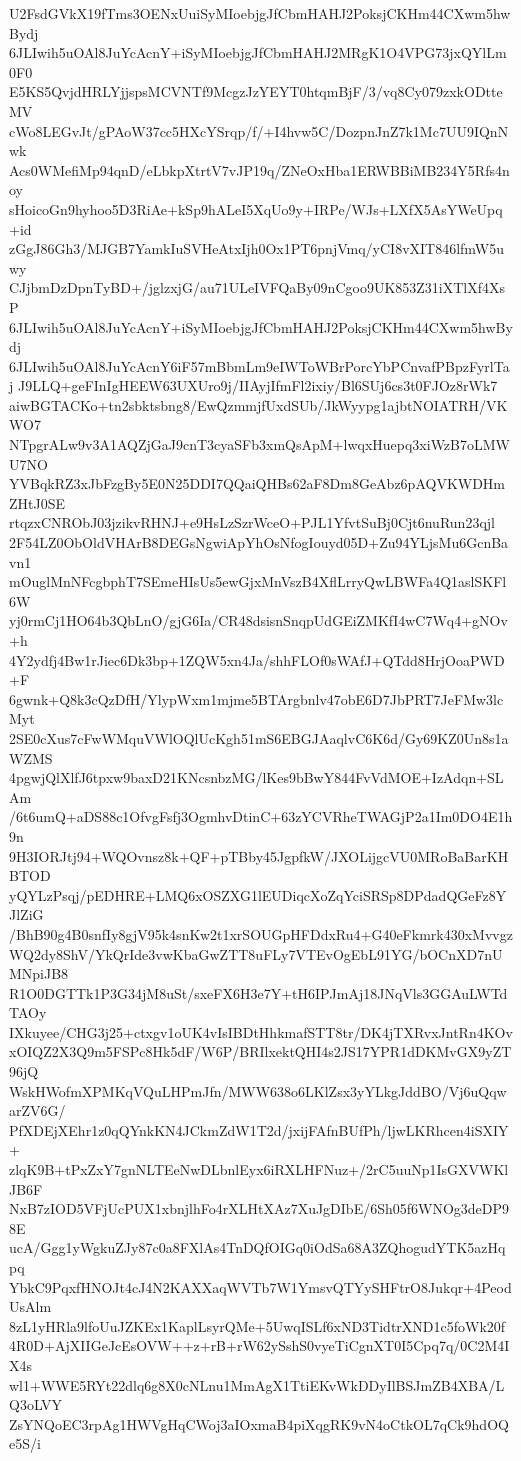 U2FsdGVkX19fTms3OENxUuiSyMIoebjgJfCbmHAHJ2PoksjCKHm44CXwm5hwBydj
6JLIwih5uOAl8JuYcAcnY+iSyMIoebjgJfCbmHAHJ2MRgK1O4VPG73jxQYlLm0F0
E5KS5QvjdHRLYjjspsMCVNTf9McgzJzYEYT0htqmBjF/3/vq8Cy079zxkODtteMV
cWo8LEGvJt/gPAoW37cc5HXcYSrqp/f/+I4hvw5C/DozpnJnZ7k1Mc7UU9IQnNwk
Acs0WMefiMp94qnD/eLbkpXtrtV7vJP19q/ZNeOxHba1ERWBBiMB234Y5Rfs4noy
sHoicoGn9hyhoo5D3RiAe+kSp9hALeI5XqUo9y+IRPe/WJs+LXfX5AsYWeUpq+id
zGgJ86Gh3/MJGB7YamkIuSVHeAtxIjh0Ox1PT6pnjVmq/yCI8vXIT846lfmW5uwy
CJjbmDzDpnTyBD+/jglzxjG/au71ULeIVFQaBy09nCgoo9UK853Z31iXTlXf4XsP
6JLIwih5uOAl8JuYcAcnY+iSyMIoebjgJfCbmHAHJ2PoksjCKHm44CXwm5hwBydj
6JLIwih5uOAl8JuYcAcnY6iF57mBbmLm9eIWToWBrPorcYbPCnvafPBpzFyrlTaj
J9LLQ+geFInIgHEEW63UXUro9j/IIAyjIfmFl2ixiy/Bl6SUj6cs3t0FJOz8rWk7
aiwBGTACKo+tn2sbktsbng8/EwQzmmjfUxdSUb/JkWyypg1ajbtNOIATRH/VKWO7
NTpgrALw9v3A1AQZjGaJ9cnT3cyaSFb3xmQsApM+lwqxHuepq3xiWzB7oLMWU7NO
YVBqkRZ3xJbFzgBy5E0N25DDI7QQaiQHBs62aF8Dm8GeAbz6pAQVKWDHmZHtJ0SE
rtqzxCNRObJ03jzikvRHNJ+e9HsLzSzrWceO+PJL1YfvtSuBj0Cjt6nuRun23qjl
2F54LZ0ObOldVHArB8DEGsNgwiApYhOsNfogIouyd05D+Zu94YLjsMu6GcnBavn1
mOuglMnNFcgbphT7SEmeHIsUs5ewGjxMnVszB4XflLrryQwLBWFa4Q1aslSKFl6W
yj0rmCj1HO64b3QbLnO/gjG6Ia/CR48dsisnSnqpUdGEiZMKfI4wC7Wq4+gNOv+h
4Y2ydfj4Bw1rJiec6Dk3bp+1ZQW5xn4Ja/shhFLOf0sWAfJ+QTdd8HrjOoaPWD+F
6gwnk+Q8k3cQzDfH/YlypWxm1mjme5BTArgbnlv47obE6D7JbPRT7JeFMw3lcMyt
2SE0cXus7cFwWMquVWlOQlUcKgh51mS6EBGJAaqlvC6K6d/Gy69KZ0Un8s1aWZMS
4pgwjQlXlfJ6tpxw9baxD21KNcsnbzMG/lKes9bBwY844FvVdMOE+IzAdqn+SLAm
/6t6umQ+aDS88c1OfvgFsfj3OgmhvDtinC+63zYCVRheTWAGjP2a1Im0DO4E1h9n
9H3IORJtj94+WQOvnsz8k+QF+pTBby45JgpfkW/JXOLijgcVU0MRoBaBarKHBTOD
yQYLzPsqj/pEDHRE+LMQ6xOSZXG1lEUDiqcXoZqYciSRSp8DPdadQGeFz8YJlZiG
/BhB90g4B0snfIy8gjV95k4snKw2t1xrSOUGpHFDdxRu4+G40eFkmrk430xMvvgz
WQ2dy8ShV/YkQrIde3vwKbaGwZTT8uFLy7VTEvOgEbL91YG/bOCnXD7nUMNpiJB8
R1O0DGTTk1P3G34jM8uSt/sxeFX6H3e7Y+tH6IPJmAj18JNqVls3GGAuLWTdTAOy
IXkuyee/CHG3j25+ctxgv1oUK4vIsIBDtHhkmafSTT8tr/DK4jTXRvxJntRn4KOv
xOIQZ2X3Q9m5FSPc8Hk5dF/W6P/BRIlxektQHI4s2JS17YPR1dDKMvGX9yZT96jQ
WskHWofmXPMKqVQuLHPmJfn/MWW638o6LKlZsx3yYLkgJddBO/Vj6uQqwarZV6G/
PfXDEjXEhr1z0qQYnkKN4JCkmZdW1T2d/jxijFAfnBUfPh/ljwLKRhcen4iSXIY+
zlqK9B+tPxZxY7gnNLTEeNwDLbnlEyx6iRXLHFNuz+/2rC5uuNp1IsGXVWKlJB6F
NxB7zIOD5VFjUcPUX1xbnjlhFo4rXLHtXAz7XuJgDIbE/6Sh05f6WNOg3deDP98E
ucA/Ggg1yWgkuZJy87c0a8FXlAs4TnDQfOIGq0iOdSa68A3ZQhogudYTK5azHqpq
YbkC9PqxfHNOJt4cJ4N2KAXXaqWVTb7W1YmsvQTYySHFtrO8Jukqr+4PeodUsAlm
8zL1yHRla9lfoUuJZKEx1KaplLsyrQMe+5UwqISLf6xND3TidtrXND1c5foWk20f
4R0D+AjXIIGeJcEsOVW++z+rB+rW62ySshS0vyeTiCgnXT0I5Cpq7q/0C2M4IX4s
wl1+WWE5RYt22dlq6g8X0cNLnu1MmAgX1TtiEKvWkDDyIlBSJmZB4XBA/LQ3oLVY
ZsYNQoEC3rpAg1HWVgHqCWoj3aIOxmaB4piXqgRK9vN4oCtkOL7qCk9hdOQe5S/i
